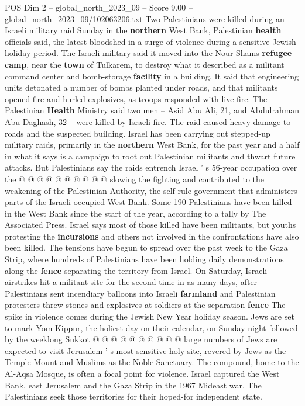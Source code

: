 \begin{textsample}{POS Dim 2 – global\_north\_2023\_09 – Score 9.00 – global\_north\_2023\_09/102063206.txt}  \label{ex:f2_pos_378}
Two Palestinians were killed during an Israeli military raid Sunday in the \textbf{northern} West Bank, Palestinian \textbf{health} officials said, the latest bloodshed in a surge of violence during a sensitive Jewish holiday period.
The Israeli military said it moved into the Nour Shams \textbf{refugee} \textbf{camp}, near the \textbf{town} of Tulkarem, to destroy what it described as a militant command center and bomb-storage \textbf{facility} in a building.
It said that engineering units detonated a number of bombs planted under roads, and that militants opened fire and hurled explosives, as troops responded with live fire.
The Palestinian \textbf{Health} Ministry said two men -- Asid Abu Ali, 21, and Abdulrahman Abu Daghash, 32 -- were killed by Israeli fire.
The raid caused heavy damage to roads and the suspected building.
Israel has been carrying out stepped-up military raids, primarily in the \textbf{northern} West Bank, for the past year and a half in what it says is a campaign to root out Palestinian militants and thwart future attacks.
But Palestinians say the raids entrench Israel ' s 56-year occupation over the @ @ @ @ @ @ @ @ @ @ slowing the fighting and contributed to the weakening of the Palestinian Authority, the self-rule government that administers parts of the Israeli-occupied West Bank.
Some 190 Palestinians have been killed in the West Bank since the start of the year, according to a tally by The Associated Press.
Israel says most of those killed have been militants, but youths protesting the \textbf{incursions} and others not involved in the confrontations have also been killed.
The tensions have begun to spread over the past week to the Gaza Strip, where hundreds of Palestinians have been holding daily demonstrations along the \textbf{fence} separating the territory from Israel.
On Saturday, Israeli airstrikes hit a militant site for the second time in as many days, after Palestinians sent incendiary balloons into Israeli \textbf{farmland} and Palestinian protesters threw stones and explosives at soldiers at the separation \textbf{fence} The spike in violence comes during the Jewish New Year holiday season.
Jews are set to mark Yom Kippur, the holiest day on their calendar, on Sunday night followed by the weeklong Sukkot @ @ @ @ @ @ @ @ @ @ large numbers of Jews are expected to visit Jerusalem ' s most sensitive holy site, revered by Jews as the Temple Mount and Muslims as the Noble Sanctuary.
The compound, home to the Al-Aqsa Mosque, is often a focal point for violence.
Israel captured the West Bank, east Jerusalem and the Gaza Strip in the 1967 Mideast war.
The Palestinians seek those territories for their hoped-for independent state.

\end{textsample}
